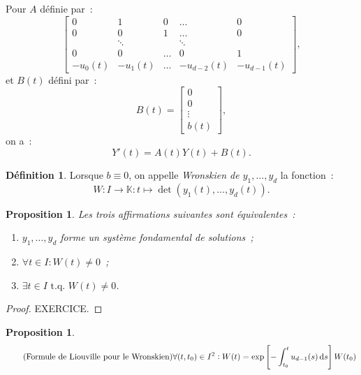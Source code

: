 \documentclass{report}
\newtheorem{prp}[thm]{Proposition}
\theoremstyle{definition}
\newtheorem{déf}[thm]{Définition}
\theoremstyle{remark}
\numberwithin{equation}{section}
\newcommand{\K}{\mathbb K}
\newcommand{\tq}{\text{ t.q. }}
\begin{document}
			Pour $A$ définie par~:
			\begin{equation}
				\begin{bmatrix}
					0 & 1 & 0 & \ldots & 0 \\
					0 & 0 & 1 & \ldots & 0 \\
					  &  \ddots & & \ddots \\
					0 & 0 & \ldots & 0 & 1 \\
					-u_0(t) & -u_1(t) & \ldots & -u_{d-2}(t) & -u_{d-1}(t)
				\end{bmatrix},
			\end{equation}
			et $B(t)$ défini par~:
			\begin{equation}
				B(t) = \begin{bmatrix}0 \\ 0 \\ \vdots \\ b(t)\end{bmatrix},
			\end{equation}
			on a~:
			\begin{equation}
				Y'(t) = A(t)Y(t) + B(t).
			\end{equation}

			\begin{déf} Lorsque $b \equiv 0$, on appelle \textit{Wronskien de $y_1, \ldots, y_d$} la fonction~:
			\begin{equation}
				W : I \to \K : t \mapsto \det\left(y_1(t), \ldots, y_d(t)\right).
			\end{equation}
			\end{déf}

			\begin{prp} Les trois affirmations suivantes sont équivalentes~:
			\begin{enumerate}
				\item $y_1, \ldots, y_d$ forme un système fondamental de solutions~;
				\item $\forall t \in I : W(t) \neq 0$~;
				\item $\exists t \in I \tq W(t) \neq 0$.
			\end{enumerate}
			\end{prp}

			\begin{proof} EXERCICE.
			\end{proof}

			\begin{prp}~
			\begin{align}\tag{Formule de Liouville pour le Wronskien}
				\forall (t, t_0) \in I^2 : W(t) = \exp\left[-\int_{t_0}^tu_{d-1}(s)\dif s\right]W(t_0)
			\end{align}
			\end{prp}
\end{document}
